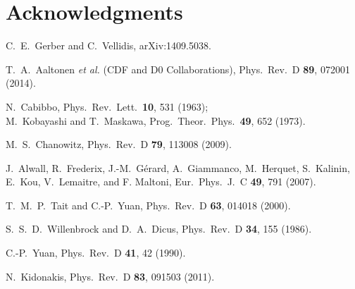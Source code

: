 \documentclass[aps,prl,twocolumn,showpacs,superscriptaddress,groupedaddress]{revtex4}  %
\begin{document}


\section*{Acknowledgments}



\begin{thebibliography}{99}


  C.~E.~Gerber and C.~Vellidis,
  arXiv:1409.5038.

  T.~A.~Aaltonen {\it et al.}  (CDF and D0 Collaborations),
  Phys.\ Rev.\ D {\bf 89}, 072001 (2014).

 N.~Cabibbo,
  Phys.\ Rev.\ Lett.\  {\bf 10}, 531 (1963); \\
 M.~Kobayashi and T.~Maskawa,
  Prog.\ Theor.\ Phys.\  {\bf 49}, 652 (1973).

  M.~S.~Chanowitz,
  Phys.\ Rev.\ D {\bf 79}, 113008 (2009).

  J.~Alwall, R.~Frederix, J.-M.~G{\'e}rard, A.~Giammanco, M.~Herquet, S.~Kalinin, E.~Kou, V.~Lemaitre, and F. Maltoni,
  Eur.\ Phys.\ J.\ C {\bf 49}, 791 (2007).

  T.~M.~P.~Tait and C.-P.~Yuan,
  Phys.\ Rev.\  D {\bf 63}, 014018 (2000).

S.~S.~D.~Willenbrock and D.~A.~Dicus,
Phys.\ Rev.\ D {\bf 34}, 155 (1986).

C.-P.~Yuan,
Phys.\ Rev.\ D {\bf 41}, 42 (1990).

  N.~Kidonakis,
  Phys.\ Rev.\ D {\bf 83}, 091503 (2011).
  

\end{thebibliography}
\end{document}
